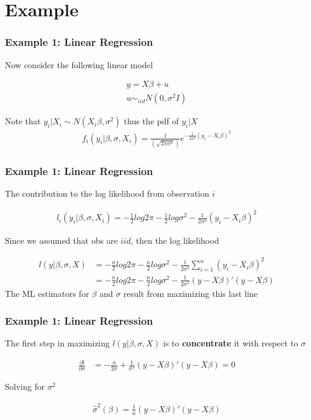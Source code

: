 \documentclass[
  shownotes,
  xcolor={svgnames},
  hyperref={colorlinks,citecolor=DarkBlue,linkcolor=DarkRed,urlcolor=DarkBlue}
  , aspectratio=169]{beamer}
\begin{document}
\section{Example}
\begin{frame}[fragile]
\frametitle{Example 1: Linear Regression}

Now consider the following linear model 
\medskip

\begin{align}
y=X\beta+u \\
u\sim_{iid} N(0,\sigma^2I)
\end{align}

\medskip
Note that $y_i|X_i\sim N(X_i\beta,\sigma^2)$ thus the pdf of $y_i|X$
\medskip
\begin{align}
f_i(y_i|\beta,\sigma,X_i)=\frac{1}{(\sqrt{2\pi\sigma^2})}e^{-\frac{1}{2\sigma^2}(y_i-X_i\beta)^2}
\end{align}


\end{frame}

\begin{frame}[fragile]
\frametitle{Example 1: Linear Regression}
The contribution to the log likelihood from observation $i$

\begin{align}
l_i(y_i|\beta,\sigma,X_i)=-\frac{1}{2}log 2 \pi-\frac{1}{2}log\sigma^2-\frac{1}{2\sigma^2}(y_i-X_i\beta)^2
\end{align}

Since we assumed that obs are $iid$, then the log likelihood

\begin{align}
l(y|\beta,\sigma,X) &=-\frac{n}{2}log 2 \pi-\frac{n}{2}log\sigma^2-\frac{1}{2\sigma^2}\sum_{i=1}^n(y_i-X_i\beta)^2  \\
&=-\frac{n}{2}log 2 \pi-\frac{n}{2}log\sigma^2-\frac{1}{2\sigma^2}(y-X\beta)'(y-X\beta)
\end{align}
The ML estimators for $\beta$ and $\sigma$ result from maximizing this last line

\end{frame}
\begin{frame}[fragile]
\frametitle{Example 1: Linear Regression}


The first step in maximizing $l(y|\beta,\sigma,X)$ is to {\bf concentrate} it with respect to $\sigma$

\begin{align}
\frac{\partial l}{\partial \sigma}&=-\frac{n}{2\sigma}+\frac{1}{\sigma^3}(y-X\beta)'(y-X\beta)=0
\end{align}

Solving for $\sigma^2$

\begin{align}
\hat \sigma^2(\beta) = \frac{1}{n}(y-X\beta)'(y-X\beta)
\end{align}

\end{frame}
\end{document}
